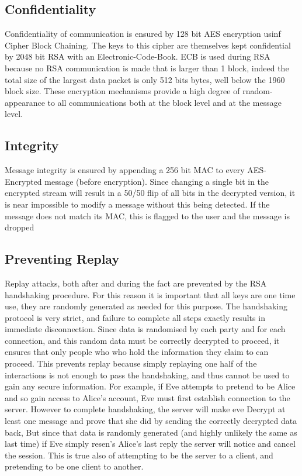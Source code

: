 \subsection{Confidentiality}
Confidentiality of communication is ensured by 128 bit AES encryption usinf Cipher Block Chaining.
The keys to this cipher are themselves kept confidential by 2048 bit RSA with an Electronic-Code-Book.
ECB is used during RSA because no RSA communication is made that is larger than 1 block, indeed the total size of the largest data packet is only 512 bits bytes, well below the 1960 block size.
These encryption mechanisms provide a high degree of rnadom-appearance to all communications both at the block level and at the message level.
\subsection{Integrity}
Message integrity is ensured by appending a 256 bit MAC to every AES-Encrypted message (before encryption).
Since changing a single bit in the encrypted stream will result in a 50/50 flip of all bits in the decrypted version, it is near impossible to modify a message without this being detected.
If the message does not match its MAC, this is flagged to the user and the message is dropped
\subsection{Preventing Replay}
Replay attacks, both after and during the fact are prevented by the RSA handshaking procedure.
For this reason it is important that all keys are one time use, they are randomly generated as needed for this purpose.
The handshaking protocol is very strict, and failure to complete all steps exactly results in immediate disconnection.
Since data is randomised by each party and for each connection, and this random data must be correctly decrypted to proceed, it ensures that only people who who hold the information they claim to can proceed.
This prevents replay because simply replaying one half of the interactions is not enough to pass the handshaking, and thus cannot be used to gain any secure information.
For example, if Eve attempts to pretend to be Alice and so gain access to Alice's account, Eve must first establish connection to the server.
However to complete handshaking, the server will make eve Decrypt at least one message and prove that she did by sending the correctly decrypted data back, But since that data is randomly generated (and highly unlikely the same as last time) if Eve simply resen's Alice's last reply the server will notice and cancel the session.
This is true also of attempting to be the server to a client, and pretending to be one client to another.

